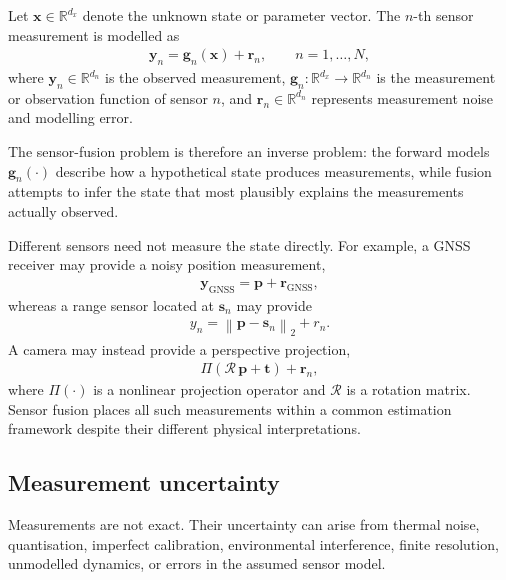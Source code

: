\documentclass[graybox,envcountchap]{style/SNmono}
\begin{document}
Let $\mathbf{x}\in\mathbb{R}^{d_x}$ denote the unknown state or parameter vector. The $n$-th sensor measurement is modelled as
\begin{align}
\mathbf{y}_n=\mathbf{g}_n(\mathbf{x})+\mathbf{r}_n, \qquad n=1,\ldots,N,
\end{align}
where $\mathbf{y}_n\in\mathbb{R}^{d_n}$ is the observed measurement, $\mathbf{g}_n:\mathbb{R}^{d_x}\rightarrow\mathbb{R}^{d_n}$ is the measurement or observation function of sensor $n$, and $\mathbf{r}_n\in\mathbb{R}^{d_n}$ represents measurement noise and modelling error.

The sensor-fusion problem is therefore an inverse problem: the forward models $\mathbf{g}_n(\cdot)$ describe how a hypothetical state produces measurements, while fusion attempts to infer the state that most plausibly explains the measurements actually observed. 

Different sensors need not measure the state directly. For example, a GNSS receiver may provide a noisy position measurement,
\begin{align*}
\mathbf{y}_{\mathrm{GNSS}}=\mathbf{p}+\mathbf{r}_{\mathrm{GNSS}},
\end{align*}
whereas a range sensor located at $\mathbf{s}_n$ may provide
\begin{align*}
y_n=\left\|\mathbf{p}-\mathbf{s}_n\right\|_2+r_n.
\end{align*}
A camera may instead provide a perspective projection,
\begin{align*}
\Pi\left(\boldsymbol{\mathcal{R}}\,\mathbf{p}+\mathbf{t}\right) +\mathbf{r}_n,
\end{align*}
where $\Pi(\cdot)$ is a nonlinear projection operator and $\boldsymbol{\mathcal{R}}$ is a rotation matrix. Sensor fusion places all such measurements within a common estimation framework despite their different physical interpretations.


\subsection{Measurement uncertainty}

Measurements are not exact. Their uncertainty can arise from thermal noise, quantisation, imperfect calibration, environmental interference, finite resolution, unmodelled dynamics, or errors in the assumed sensor model.
\end{document}

